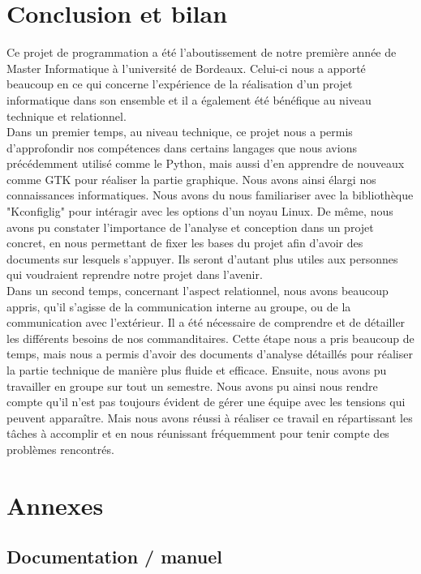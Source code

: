 \documentclass[16pts]{report}
\begin{document}
\chapter{Conclusion et bilan}
\label{cha:Conclusion et bilan}

Ce projet de programmation a été l'aboutissement de notre première année 
de Master Informatique à l'université de Bordeaux. Celui-ci nous a apporté 
beaucoup en ce qui concerne l'expérience de la réalisation d'un projet 
informatique dans son ensemble et il a également été bénéfique au niveau 
technique et relationnel.\\

Dans un premier temps, au niveau technique, ce projet nous a permis 
d'approfondir nos compétences dans certains langages que nous avions 
précédemment utilisé comme le Python, mais aussi d'en apprendre de 
nouveaux comme GTK pour réaliser la partie graphique. Nous avons ainsi 
élargi nos connaissances informatiques. Nous avons du nous familiariser 
avec la bibliothèque "Kconfiglig" pour intéragir avec les options d'un 
noyau Linux. De même, nous avons pu constater l'importance de l'analyse 
et conception dans un projet concret, en nous permettant de fixer les bases 
du projet afin d'avoir des documents sur lesquels s'appuyer. Ils seront 
d'autant plus utiles aux personnes qui voudraient reprendre notre projet 
dans l'avenir.\\

Dans un second temps, concernant l'aspect relationnel, nous avons beaucoup 
appris, qu'il s'agisse de la communication interne au groupe, ou de la 
communication avec l'extérieur. Il a été nécessaire de comprendre et de 
détailler les différents besoins de nos commanditaires. Cette étape nous 
a pris beaucoup de temps, mais nous a permis d'avoir des documents d'analyse 
détaillés pour réaliser la partie technique de manière plus fluide et efficace. 
Ensuite, nous avons pu travailler en groupe sur tout un semestre. Nous 
avons pu ainsi nous rendre compte qu'il n'est pas toujours évident de gérer 
une équipe avec les tensions qui peuvent apparaître. Mais nous avons réussi à 
réaliser ce travail en répartissant les tâches à accomplir et en nous 
réunissant fréquemment pour tenir compte des problèmes rencontrés.\\


\chapter{Annexes}
\label{cha:Annexes}
    \section{Documentation / manuel}
    \label{sec:Documentation / manuel}


\end{document}
